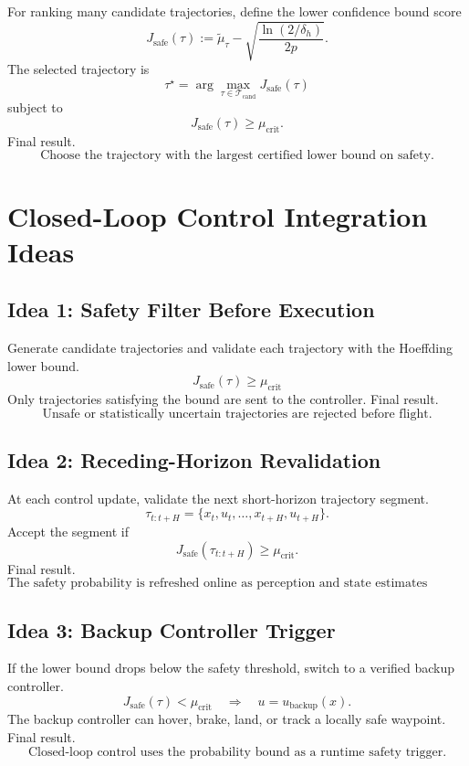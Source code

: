 \documentclass[11pt]{article}
\begin{document}
For ranking many candidate trajectories, define the lower confidence bound score
\[
J_{\mathrm{safe}}(\tau)
:=
\tilde\mu_\tau
-
\sqrt{
\frac{\ln(2/\delta_h)}{2p}
}.
\]
The selected trajectory is
\[
\tau^\star
=
\arg\max_{\tau\in\mathcal T_{\mathrm{cand}}}
J_{\mathrm{safe}}(\tau)
\]
subject to
\[
J_{\mathrm{safe}}(\tau)\ge\mu_{\mathrm{crit}}.
\]
Final result.
\[
\boxed{
\text{Choose the trajectory with the largest certified lower bound on safety.}
}
\]

\section*{Closed-Loop Control Integration Ideas}

\subsection*{Idea 1: Safety Filter Before Execution}

Generate candidate trajectories and validate each trajectory with the Hoeffding lower bound.
\[
J_{\mathrm{safe}}(\tau)
\ge
\mu_{\mathrm{crit}}
\]
Only trajectories satisfying the bound are sent to the controller.
Final result.
\[
\boxed{
\text{Unsafe or statistically uncertain trajectories are rejected before flight.}
}
\]

\subsection*{Idea 2: Receding-Horizon Revalidation}

At each control update, validate the next short-horizon trajectory segment.
\[
\tau_{t:t+H}
=
\{x_t,u_t,\ldots,x_{t+H},u_{t+H}\}.
\]
Accept the segment if
\[
J_{\mathrm{safe}}(\tau_{t:t+H})\ge\mu_{\mathrm{crit}}.
\]
Final result.
\[
\boxed{
\text{The safety probability is refreshed online as perception and state estimates change.}
}
\]

\subsection*{Idea 3: Backup Controller Trigger}

If the lower bound drops below the safety threshold, switch to a verified backup controller.
\[
J_{\mathrm{safe}}(\tau)<\mu_{\mathrm{crit}}
\quad\Rightarrow\quad
u=u_{\mathrm{backup}}(x).
\]
The backup controller can hover, brake, land, or track a locally safe waypoint.
Final result.
\[
\boxed{
\text{Closed-loop control uses the probability bound as a runtime safety trigger.}
}
\]
\end{document}
